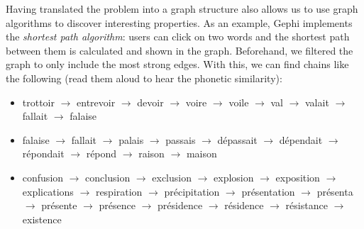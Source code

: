 Having translated the problem into a graph structure also allows us to use graph algorithms to discover interesting properties. As an example, Gephi implements the \textit{shortest path algorithm}: users can click on two words and the shortest path between them is calculated and shown in the graph. Beforehand, we filtered the graph to only include the most strong edges. With this, we can find chains like the following (read them aloud to hear the phonetic similarity):
\begin{itemize}
    \item trottoir $\rightarrow$ entrevoir $\rightarrow$ devoir $\rightarrow$ voire $\rightarrow$ voile $\rightarrow$ val $\rightarrow$ valait $\rightarrow$ fallait $\rightarrow$ falaise
    \item falaise $\rightarrow$ fallait $\rightarrow$ palais $\rightarrow$ passais $\rightarrow$ dépassait $\rightarrow$ dépendait $\rightarrow$ répondait $\rightarrow$ répond $\rightarrow$ raison $\rightarrow$ maison
    \item confusion $\rightarrow$ conclusion $\rightarrow$ exclusion $\rightarrow$ explosion $\rightarrow$ exposition $\rightarrow$ explications $\rightarrow$ respiration $\rightarrow$ précipitation $\rightarrow$ présentation $\rightarrow$ présenta $\rightarrow$ présente $\rightarrow$ présence $\rightarrow$ présidence $\rightarrow$ résidence $\rightarrow$ résistance $\rightarrow$ existence
\end{itemize}
